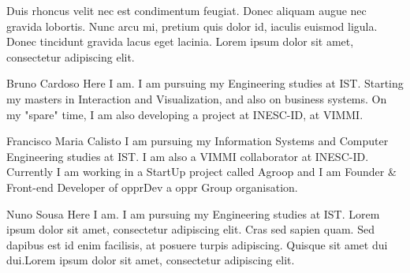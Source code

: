 \documentclass[a4paper,12pt,journal,twoside,compsoc]{PPIEEEtran}
\begin{document}
Duis rhoncus velit nec est condimentum feugiat. Donec aliquam augue nec gravida lobortis. Nunc arcu mi, pretium quis dolor id, iaculis euismod ligula. Donec tincidunt gravida lacus eget lacinia. Lorem ipsum dolor sit amet, consectetur adipiscing elit.

%

% 
\begin{IEEEbiography}{Bruno Cardoso}
Here I am. I am pursuing my Engineering studies at \ac{IST}. Starting my masters in Interaction and Visualization, and also on business systems. On my "spare" time, I am also developing a project at INESC-ID, at VIMMI.
\end{IEEEbiography}
\begin{IEEEbiography}
{Francisco Maria Calisto}
I am pursuing my Information Systems and Computer  Engineering studies at \ac{IST}. I am also a VIMMI collaborator at INESC-ID. Currently I am working in a StartUp project called Agroop and I am Founder \& Front-end Developer of opprDev a oppr Group organisation.
\end{IEEEbiography}
\begin{IEEEbiography}
{Nuno Sousa}
Here I am. I am pursuing my Engineering studies at \ac{IST}. Lorem ipsum dolor sit amet, consectetur adipiscing elit. Cras sed sapien quam. Sed dapibus est id enim facilisis, at posuere turpis adipiscing. Quisque sit amet dui dui.Lorem ipsum dolor sit amet, consectetur adipiscing elit. 
\end{IEEEbiography}
\end{document}
